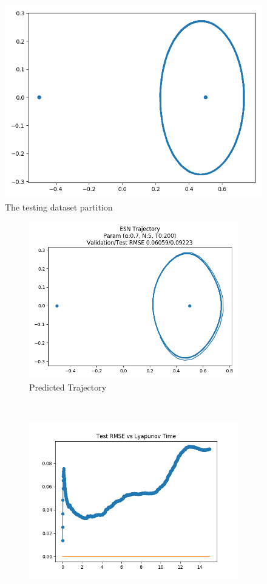 \documentclass{article}
\begin{document}
\begin{figure}[H]
    \centering
    \includegraphics[width=.5\linewidth]{doc/paper/images/r3body/test_data.png}
    \caption{The testing dataset partition}
\end{figure}

\begin{figure}[H]
    \centering
    \begin{subfigure}[b]{0.45\textwidth}
        \includegraphics[width=\textwidth]{doc/paper/images/r3body/rank_3_param_15_fit.png}
        \caption{Predicted Trajectory}
    \end{subfigure}
    ~
    \begin{subfigure}[b]{0.45\textwidth}
        \includegraphics[width=\textwidth]{doc/paper/images/r3body/rank_3_param_15_rmse.png}

\end{subfigure}
\end{figure}
\end{document}
